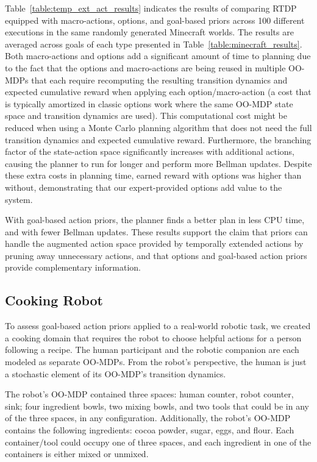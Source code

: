 \documentclass[letterpaper]{article}
\begin{document}
Table~\ref{table:temp_ext_act_results} indicates the results of
comparing RTDP equipped with macro-actions, options, and goal-based priors
across 100 different executions in the same randomly generated
Minecraft worlds. The results are averaged across goals of each type
presented in Table~\ref{table:minecraft_results}. Both macro-actions
and options add a significant amount of time to planning due to the
fact that the options and macro-actions are being reused in
multiple OO-MDPs that each require recomputing the resulting transition
dynamics and expected cumulative reward when applying each
option/macro-action (a cost that is typically amortized in classic
options work where the same OO-MDP state space and transition dynamics
are used). This computational cost might be reduced when using a Monte
Carlo planning algorithm that does not need the full transition
dynamics and expected cumulative reward.  Furthermore, the branching
factor of the state-action space significantly increases with
additional actions, causing the planner to run for longer and perform
more Bellman updates.  Despite these extra costs in planning time,
earned reward with options was higher than without, demonstrating that
our expert-provided options add value to the system.

With goal-based action priors, the planner finds a better plan in less CPU time,
and with fewer Bellman updates. These results support the claim that
priors can handle the augmented action space provided by
temporally extended actions by pruning away unnecessary actions, and
that options and goal-based action priors provide complementary information.

\subsection{Cooking Robot}

To assess goal-based action priors applied to a real-world robotic task, we created
a cooking domain that requires the robot to choose helpful actions for
a person following a recipe. The human participant and the robotic companion are each modeled as separate
OO-MDPs. From the robot's perspective, the human is just a stochastic element of its OO-MDP's
transition dynamics.

The robot's OO-MDP contained three spaces: human counter, robot counter, sink;
four ingredient bowls, two mixing bowls, and two tools that could be
in any of the three spaces, in any configuration. Additionally, the robot's OO-MDP contains
the following ingredients: cocoa powder, sugar, eggs, and flour.  Each
container/tool could occupy one of three spaces, and each ingredient in
one of the containers is either mixed or unmixed.
\end{document}
